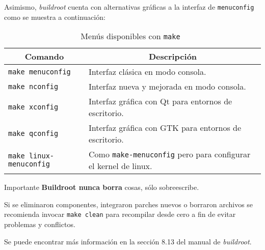 \noindent
Asimismo, \emph{buildroot} cuenta con alternativas gráficas a la interfaz de \texttt{menuconfig} como se muestra a continuación:

\begin{table}[H]
	\centering
	\caption{Menús disponibles con \texttt{make}~}%
	\label{tab:make-menus}
	\begin{tabularx}{0.9\textwidth}{l X}
		\toprule
		\multicolumn{1}{c}{\bfseries Comando}&
		\multicolumn{1}{c}{\bfseries Descripción}\\
		\midrule
		\texttt{make menuconfig} & Interfaz clásica en modo consola.\\[2mm]
		\texttt{make nconfig}    & Interfaz nueva y mejorada en modo consola.\\[2mm]
		\texttt{make xconfig}    & Interfaz gráfica con Qt para entornos de escritorio.\\[2mm]
		\texttt{make qconfig}    & Interfaz gráfica con GTK para entornos de escritorio.\\[4mm]
		\texttt{make linux-menuconfig} & Como \texttt{make-menuconfig} pero para configurar el kernel de linux.
		\\
		\bottomrule
	\end{tabularx}
\end{table}

\bigskip{}

\begin{orangebox}{Importante}
	\textbf{Buildroot nunca borra} cosas, sólo sobreescribe.

	\medskip{}

	Si se eliminaron componentes, integraron parches nuevos o borraron archivos se recomienda invocar \texttt{make clean} para recompilar desde cero a fin de evitar problemas y conflictos.
\end{orangebox}

\bigskip{}

\noindent
Se puede encontrar más información en la sección 8.13 del manual de \emph{buildroot}.
